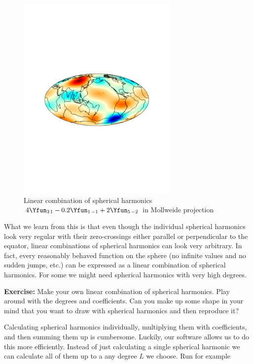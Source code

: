 \documentclass[11pt]{article}
\begin{document}
\begin{figure}[H]
\centering
\includegraphics[width=0.7\textwidth,trim = 3cm 9cm 3cm 10cm, clip]{figures/mixY}
\caption{Linear combination of spherical harmonics $4\Yfun_{3\,1} - 0.2\Yfun_{1\,-1} +2\Yfun_{5\,-2}$ in Mollweide projection}
\label{MixY}
\end{figure}

What we learn from this is that even though the individual spherical harmonics look very regular with their zero-crossings either parallel or perpendicular to the equator, linear combinations of spherical harmonics can look very arbitrary. In fact, every reasonably behaved function on the sphere (no infinite values and no sudden jumps, etc.) can be expressed as a linear combination of spherical harmonics. For some we might need spherical harmonics with very high degrees.

\textbf{Exercise:} Make your own linear combination of spherical harmonics. Play around with the degrees and coefficients. Can you make up some shape in your mind that you want to draw with spherical harmonics and then reproduce it?

Calculating spherical harmonics individually, multiplying them with coefficients, and then summing them up is cumbersome. Luckily, our software allows us to do this more efficiently. Instead of just calculating a single spherical harmonic we can calculate all of them up to a any degree
 $L$ we choose. Run for example
 
\end{document}
